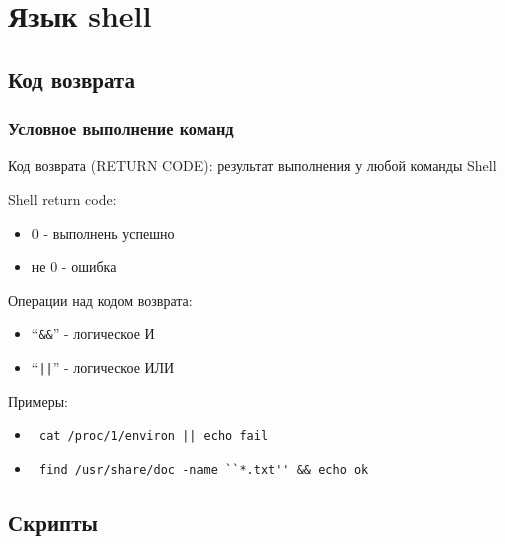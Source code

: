 \section{Язык shell}

\subsection{Код возврата}

\begin{frame}[fragile]
  \frametitle{Условное выполнение команд}

  \Large{\alert{Код возврата (RETURN CODE)}}: \newline 
  \normalsize{результат выполнения у любой команды Shell}
  \newline

  Shell return code:
  \begin{itemize}
    \item 0 - выполнень успешно
    \item не 0 - ошибка
  \end{itemize}
  \pause

  Операции над кодом возврата:
  \begin{itemize}
    \item ``\verb+&&+'' - логическое И
    \item ``\verb+||+'' - логическое ИЛИ
  \end{itemize}
  \pause

  Примеры:
  \begin{itemize}
    \item \verb+ cat /proc/1/environ || echo fail +
    \item \verb+ find /usr/share/doc -name ``*.txt'' && echo ok+
  \end{itemize}

\end{frame}

\subsection{Скрипты}

